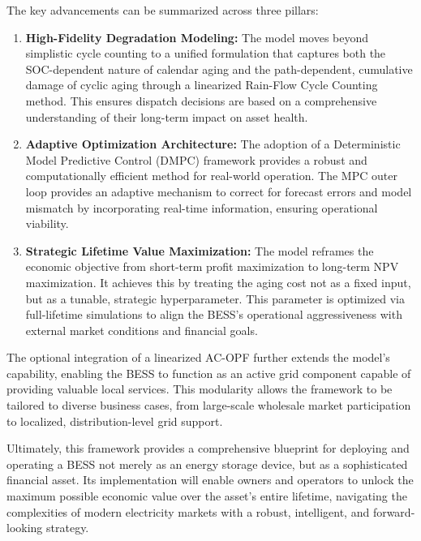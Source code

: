 The key advancements can be summarized across three pillars:
\begin{enumerate}
    \item \textbf{High-Fidelity Degradation Modeling:} The model moves beyond simplistic cycle counting to a unified formulation that captures both the SOC-dependent nature of calendar aging and the path-dependent, cumulative damage of cyclic aging through a linearized Rain-Flow Cycle Counting method. This ensures dispatch decisions are based on a comprehensive understanding of their long-term impact on asset health.
    \item \textbf{Adaptive Optimization Architecture:} The adoption of a Deterministic Model Predictive Control (DMPC) framework provides a robust and computationally efficient method for real-world operation. The MPC outer loop provides an adaptive mechanism to correct for forecast errors and model mismatch by incorporating real-time information, ensuring operational viability.
    \item \textbf{Strategic Lifetime Value Maximization:} The model reframes the economic objective from short-term profit maximization to long-term NPV maximization. It achieves this by treating the aging cost not as a fixed input, but as a tunable, strategic hyperparameter. This parameter is optimized via full-lifetime simulations to align the BESS's operational aggressiveness with external market conditions and financial goals.
\end{enumerate}

The optional integration of a linearized AC-OPF further extends the model's capability, enabling the BESS to function as an active grid component capable of providing valuable local services. This modularity allows the framework to be tailored to diverse business cases, from large-scale wholesale market participation to localized, distribution-level grid support.

Ultimately, this framework provides a comprehensive blueprint for deploying and operating a BESS not merely as an energy storage device, but as a sophisticated financial asset. Its implementation will enable owners and operators to unlock the maximum possible economic value over the asset's entire lifetime, navigating the complexities of modern electricity markets with a robust, intelligent, and forward-looking strategy.

